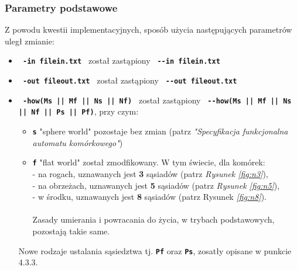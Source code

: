 \documentclass[a4paper]{article}
\begin{document}
\subsubsection{Parametry podstawowe}
\quad Z powodu kwestii implementacyjnych, spos\'ob u\.zycia nast\k{e}puj\k{a}cych parametr\'ow uleg\l{} zmianie: 
\begin{itemize}
	\item \textbf{\texttt{ -in filein.txt }} zosta\l{} zast\k{a}piony \textbf{\texttt{ -{}-in filein.txt}}
	\item \textbf{\texttt{ -out fileout.txt }} zosta\l{} zast\k{a}piony \textbf{\texttt{ -{}-out fileout.txt}}
	\item \textbf{\texttt{ -how(Ms || Mf || Ns || Nf) }} zosta\l{} zast\k{a}piony \textbf{\texttt{ -{}-how(Ms || Mf || Ns || Nf || Ps || Pf)}}, przy czym:
		\begin{itemize}
			\item \textbf{\texttt{s}} "sphere world" pozostaje bez zmian (patrz \textit{"Specyfikacja funkcjonalna automatu kom\'orkowego"})
			\item \textbf{\texttt{f}} "flat world" zosta\l{} zmodfikowany. 
				W tym \'swiecie, dla kom\'orek: 
				\\- na rogach, uznawanych jest \textbf{3} s\k{a}siad\'ow (patrz \textit{Rysunek \ref{fig:n3}}),
				\\- na obrze\.zach, uznawanych jest \textbf{5} s\k{a}siad\'ow (patrz \textit{Rysunek \ref{fig:n5}}), 
				\\- w \'srodku, uznawanych jest \textbf{8} s\k{a}siad\'ow (patrz Rysunek \textit{\ref{fig:n8}}). 
				\\ \\ Zasady umierania i powracania do \.zycia, w trybach podstawowych, pozostaj\k{a} takie same.  
		\end{itemize} 
		Nowe rodzaje ustalania s\k{a}siedztwa tj. \textbf{\texttt{Pf}} oraz \textbf{\texttt{Ps}}, zosat\l{}y opisane w punkcie 4.3.3.
		


\end{itemize}
\end{document}
